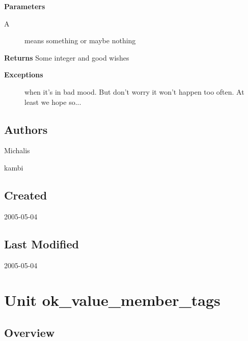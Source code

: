 \documentclass{report}
\begin{document}
\begin{list}{}
  \par
\item[\textbf{Parameters}]
\begin{description}
\item[A] means something or maybe nothing
\end{description}
\item[\textbf{Returns}]Some integer and good wishes
\item[\textbf{Exceptions}]
\begin{description}
\item[\begin{ttfamily}EBar\end{ttfamily}(\ref{ok_expanding_descriptions.EBar})] when it's in bad mood. But don't worry it won't happen too often. At least we hope so...
\end{description}


\end{list}
\section{Authors}
\par
Michalis

\par
kambi

\section{Created}
\par
2005{-}05{-}04


\section{Last Modified}
\par
2005{-}05{-}04


\chapter{Unit ok{\_}value{\_}member{\_}tags}
\section{Overview}
\begin{description}
\item[\texttt{\begin{ttfamily}TMyClass\end{ttfamily} Class}]
\item[\texttt{\begin{ttfamily}TMyRecord\end{ttfamily} Record}]
\end{description}
\end{document}

